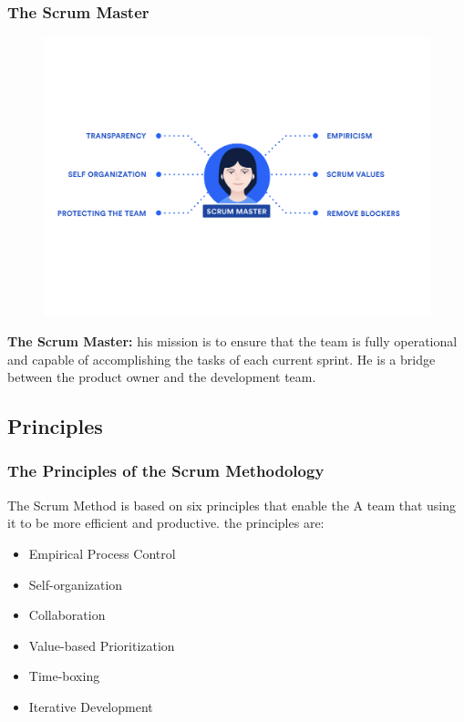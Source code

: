 \documentclass[
	11pt, %
]{beamer}
\begin{document}
\begin{frame}
	\frametitle{The Scrum Master}
	\begin{figure}
		\centering
		\includegraphics[width=0.7\linewidth]{Scrum-Master-revised.png}
	\end{figure}
	\tiny
	\textbf{The Scrum Master:} his mission is to ensure that the team is fully operational and capable
	of accomplishing the tasks of each current sprint. He is a bridge between the product owner and the development team.
\end{frame}



\subsection{Principles}

\begin{frame}
	\frametitle{The Principles of the Scrum Methodology}
	The Scrum Method is based on six principles that enable the
	A team that using it to be more efficient and productive.
	the principles are:
	\newline

	\begin{itemize}
		\item Empirical Process Control
		\item Self-organization
		\item Collaboration
		\item Value-based Prioritization
		\item Time-boxing
		\item Iterative Development
	\end{itemize}

\end{frame}
\end{document}
